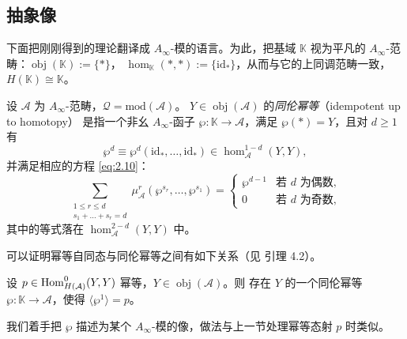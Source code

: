 \subsection{抽象像}\label{sec:4.2}

下面把刚刚得到的理论翻译成 $A_\infty$-模的语言。为此，把基域 $\mathbb K$ 视为平凡的
$A_\infty$-范畴：$\operatorname{obj}(\mathbb K):=\{*\}$，
$\hom_{\mathbb K}(*,*):=\{\mathrm{id}_*\}$，从而与它的上同调范畴一致，
$H(\mathbb K)\cong\mathbb K$。

\begin{Def}\label{def:4.5}
设 $\mathcal A$ 为 $A_\infty$-范畴，$\mathcal Q=\mathrm{mod}(\mathcal A)$。
$Y\in\operatorname{obj}(\mathcal A)$ 的\emph{同伦幂等}（idempotent up to homotopy）
是指一个非幺 $A_\infty$-函子 $\wp:\mathbb K\to\mathcal A$，满足 $\wp(*)=Y$，且对
$d\ge1$ 有
\[
  \wp^d\equiv\wp^d(\mathrm{id}_*,\dots,\mathrm{id}_*)\in\hom^{1-d}_{\mathcal A}(Y,Y),
\]
并满足相应的方程 \eqref{eq:2.10}：
\[
  \sum_{\substack{1\le r\le d\\ s_1+\dots+s_r=d}}
    \mu^r_{\mathcal A}(\wp^{s_r},\dots,\wp^{s_1})
  =
  \begin{cases}
    \wp^{d-1} & \text{若 $d$ 为偶数},\\
    0 & \text{若 $d$ 为奇数},
  \end{cases}
\]
其中的等式落在 $\hom^{2-d}_{\mathcal A}(Y,Y)$ 中。
\end{Def}

可以证明幂等自同态与同伦幂等之间有如下关系（见 \cite{Sei08} 引理 4.2）。

\begin{Lem}\label{lem:4.6}
设 $p\in\operatorname{Hom}^0_{H(\mathcal A)}(Y,Y)$ 幂等，$Y\in\operatorname{obj}(\mathcal A)$。则
存在 $Y$ 的一个同伦幂等 $\wp:\mathbb K\to\mathcal A$，使得 $\langle\wp^1\rangle=p$。
\end{Lem}

我们着手把 $\wp$ 描述为某个 $A_\infty$-模的像，做法与上一节处理幂等态射 $p$ 时类似。

